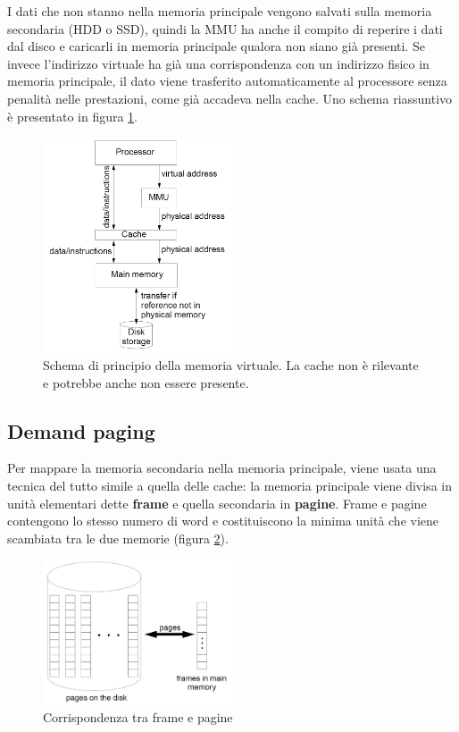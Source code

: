 \documentclass[11pt,4paper]{report}
\begin{document}
I dati che non stanno nella memoria principale vengono salvati sulla memoria secondaria (HDD o SSD), quindi la MMU ha anche il compito di reperire i dati dal disco e caricarli in memoria principale qualora non siano già presenti. Se invece l'indirizzo virtuale ha già una corrispondenza con un indirizzo fisico in memoria principale, il dato viene trasferito automaticamente al processore senza penalità nelle prestazioni, come già accadeva nella cache. Uno schema riassuntivo è presentato in figura \ref{fig:virtual_memory}.

\begin{figure}[hbtp]
	\centering
	\includegraphics[width=0.5\textwidth]{mem_sys/virtual_memory}
	\caption{Schema di principio della memoria virtuale. La cache non è rilevante e potrebbe anche non essere presente.}
	\label{fig:virtual_memory}
\end{figure}

\subsection{Demand paging}
Per mappare la memoria secondaria nella memoria principale, viene usata una tecnica del tutto simile a quella delle cache: la memoria principale viene divisa in unità elementari dette \textbf{frame} e quella secondaria in \textbf{pagine}. Frame e pagine contengono lo stesso numero di word e costituiscono la minima unità che viene scambiata tra le due memorie (figura \ref{fig:frames_pages}).

\begin{figure}[hbtp]
	\centering
	\includegraphics[width=0.5\textwidth]{mem_sys/frames_pages}
	\caption{Corrispondenza tra frame e pagine}
	\label{fig:frames_pages}
\end{figure}
\end{document}
